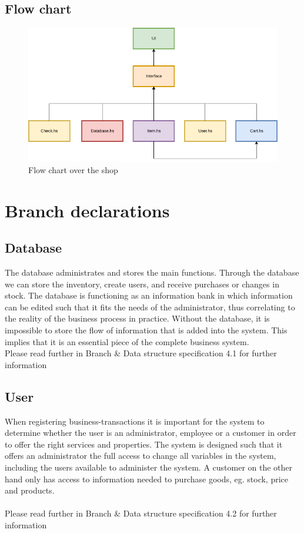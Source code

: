 \documentclass[11pt]{article}
\begin{document}
\subsection{Flow chart}
\begin{figure}[h]
  \includegraphics[width=\linewidth]{FlowChart.png}
  \caption{Flow chart over the shop}
  \label{fig:flow chart}
\end{figure}
\newpage
\section{Branch declarations}
\subsection{Database}
The database administrates and stores the main functions. Through the database we can store the inventory, create users, and receive purchases or changes in stock.
The database is functioning as an information bank in which information can be edited such that it fits the needs of the administrator, thus correlating to the reality of the business process in practice. Without the database, it is impossible to store the flow of information that is added into the system. This implies that it is an essential piece of the complete business system.
\\
Please read further in Branch \& Data structure specification 4.1 for further information
\subsection{User}
When registering business-transactions it is important for the system to determine whether the user is an administrator, employee or a customer in order to offer the right services and properties.
The system is designed such that it offers an administrator the full access to change all variables in the system, including the users available to administer the system.
A customer on the other hand only has access to information needed to purchase goods, eg. stock, price and products.
\\\\
Please read further in Branch \& Data structure specification 4.2 for further information
\end{document}
